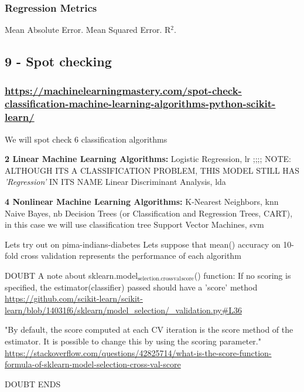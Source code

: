 \documentclass[11pt]{article}
\begin{document}
\subsubsection{Regression Metrics}
\label{sec:orgfc47eff}
Mean Absolute Error.
Mean Squared Error.
R\(^{\text{2}}\).

\subsection{9 - Spot checking}
\label{sec:org3550d7f}
\subsubsection{\url{https://machinelearningmastery.com/spot-check-classification-machine-learning-algorithms-python-scikit-learn/}}
\label{sec:orgef1ee0a}

We will spot check 6 classification algorithms

\textbf{2 Linear Machine Learning Algorithms:}
Logistic Regression, lr                 ;;;; NOTE: ALTHOUGH ITS A CLASSIFICATION PROBLEM, THIS MODEL STILL HAS \emph{'Regression'} IN ITS NAME
Linear Discriminant Analysis, lda

\textbf{4 Nonlinear Machine Learning Algorithms:}
K-Nearest Neighbors, knn
Naive Bayes, nb
Decision Trees (or Classification and Regression Trees, CART), in this case we will use classification tree
Support Vector Machines, svm

Lets try out on pima-indians-diabetes
Lets suppose that mean() accuracy on 10-fold cross validation represents the performance of each algorithm

DOUBT
A note about sklearn.model\(_{\text{selection.cross}}\)\(_{\text{val}}\)\(_{\text{score}}\)() function:
If no scoring is specified, the estimator(classifier) passed should have a 'score' method
\url{https://github.com/scikit-learn/scikit-learn/blob/14031f6/sklearn/model\_selection/\_validation.py\#L36}

"By default, the score computed at each CV iteration is the score
method of the estimator. It is possible to change this by using the
scoring parameter." 
\url{https://stackoverflow.com/questions/42825714/what-is-the-score-function-formula-of-sklearn-model-selection-cross-val-score}

DOUBT ENDS
\end{document}
